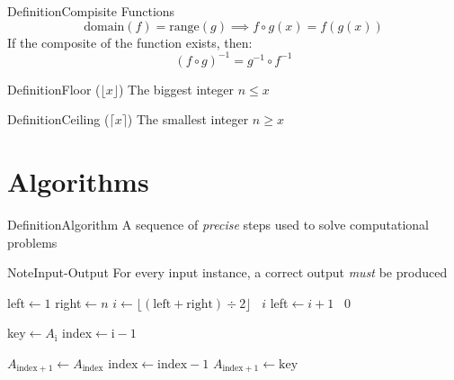 \documentclass{MathNotes}
\newenvironment{definition}[1]{\begin{RedBox}{Definition}{#1}}{\end{RedBox}}
\newenvironment{note}[1]{\begin{YellowBox}{Note}{#1}}{\end{YellowBox}}
\begin{document}
\begin{definition}{Compisite Functions}\label{def:composite-function}
	\[\text{domain}(f)=\text{range}(g)\implies f\circ g(x)=f(g(x))\]
	If the composite of the function exists, then:
	\[(f\circ g)^{-1}=g^{-1}\circ f^{-1}\]
\end{definition}

\begin{multicols}{2}
	\begin{definition}{Floor ($\lfloor x\rfloor$)}\label{def:floor-function}
		The biggest integer $n\leq x$
	\end{definition}
	\begin{definition}{Ceiling ($\lceil x\rceil$)}\label{def:floor-function}
		The smallest integer $n\geq x$
	\end{definition}
\end{multicols}
\section{Algorithms}
\begin{multicols}{2}
	\begin{definition}{Algorithm}\label{def:algorithm}
		A sequence of \textit{precise} steps used to solve computational problems
	\end{definition}
	\begin{note}{Input-Output}\label{note:input-output}
		For every input instance, a correct output \textit{must} be produced
	\end{note}
\end{multicols}

\begin{algorithm}
	\caption{Binary Search Algorithm}\label{alg:binary-search}


	left$\gets 1$\;
	right$\gets n$\;
	{
		$i\gets\lfloor(\text{left}+\text{right})\div 2\rfloor$\;
		{
			\KwRet~$i$\;
		}
		{
			left$\gets i+1$\;
		}
	}
	\KwRet~$0$\;
\end{algorithm}

\begin{algorithm}
	\caption{Insertion Sort}\label{alg:insertion-sort}

	{
		key$\gets A_{\text{i}}$\;
		index$\gets\text{i}-1$\;

		{
			$A_{\text{index}+1}\gets A_{\text{index}}$\;
			$\text{index}\gets\text{index}-1$\;
		}
		$A_{\text{index}+1}\gets\text{key}$\;
	}

\end{algorithm}
\end{document}
